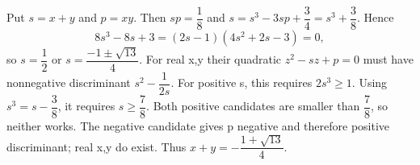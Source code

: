 Put $s=x+y$ and $p=xy$. Then $sp=\dfrac{1}{8}$ and $s=s^3-3 sp+\dfrac{3}{4}=s^3+\dfrac{3}{8}$. Hence\[8 s^3-8 s+3=(2 s-1)(4 s^2+2 s-3)=0,\]so $s=\dfrac{1}{2}$ or $s=\dfrac{-1\pm\sqrt{13}}{4}$. For real x,y their quadratic $z^2-sz+p=0$ must have nonnegative discriminant $s^2-\dfrac{1}{2 s}$. For positive s, this requires $2 s^3\ge 1$. Using $s^3=s-\dfrac{3}{8}$, it requires $s\ge\dfrac{7}{8}$. Both positive candidates are smaller than $\dfrac{7}{8}$, so neither works. The negative candidate gives p negative and therefore positive discriminant; real x,y do exist. Thus $\boxed{x+y=-\dfrac{1+\sqrt{13}}{4}}$.

